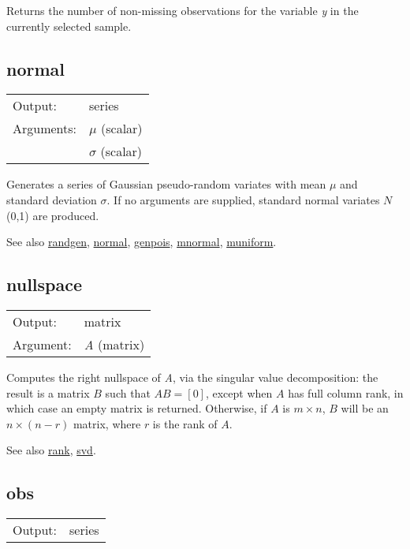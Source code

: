 	  Returns the number of non-missing observations for the variable
	  \textsl{y} in the currently selected sample.

\subsection{normal}
\hypertarget{func-normal}{}

\begin{tabular}{ll}
Output:     & series\\
Arguments:  & \textsl{$\mu$} (scalar)\\
           & \textsl{$\sigma$} (scalar)\\
\end{tabular}

	  Generates a series of Gaussian pseudo-random variates with mean
	  $\mu$ and standard deviation $\sigma$. If no arguments are
	  supplied, standard normal variates \ensuremath{N}(0,1) are
	  produced.

	  See also \hyperlink{func-randgen}{randgen}, \hyperlink{func-normal}{normal}, \hyperlink{func-genpois}{genpois}, \hyperlink{func-mnormal}{mnormal}, \hyperlink{func-muniform}{muniform}.

\subsection{nullspace}
\hypertarget{func-nullspace}{}

\begin{tabular}{ll}
Output:     & matrix\\
Argument:   & \textsl{A} (matrix)\\
\end{tabular}

	  Computes the right nullspace of \textsl{A}, via the
	  singular value decomposition: the result is a matrix $B$ such
	  that $AB = [0]$, except when $A$ has full column rank, in which
	  case an empty matrix is returned. Otherwise, if $A$ is $m \times
	  n$, $B$ will be an $n \times (n-r)$ matrix, where $r$ is the
	  rank of $A$.  

	  See also \hyperlink{func-rank}{rank}, \hyperlink{func-svd}{svd}.

\subsection{obs}
\hypertarget{func-obs}{}

\begin{tabular}{ll}
Output:     & series\\
\end{tabular}

